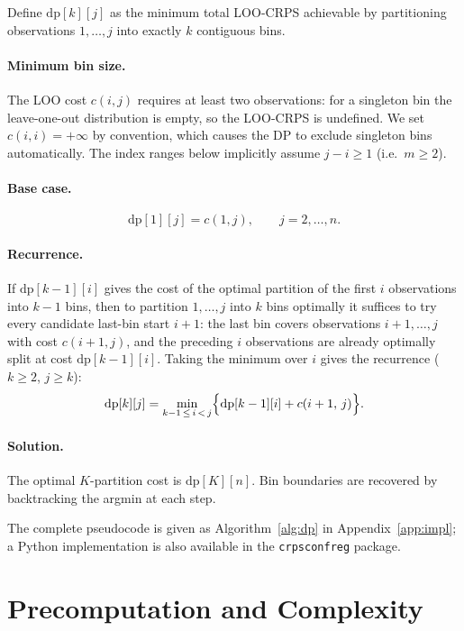 \documentclass[11pt]{article}
\begin{document}
Define $\mathrm{dp}[k][j]$ as the minimum total LOO-CRPS achievable by partitioning
observations $1, \ldots, j$ into exactly $k$ contiguous bins.

\paragraph{Minimum bin size.}
The LOO cost $c(i,j)$ requires at least two observations: for a singleton bin
the leave-one-out distribution is empty, so the LOO-CRPS is undefined.
We set $c(i,i) = +\infty$ by convention, which causes the DP to exclude
singleton bins automatically.
The index ranges below implicitly assume $j - i \ge 1$ (i.e.\ $m \ge 2$).

\paragraph{Base case.}
\[
  \mathrm{dp}[1][j] = c(1, j), \qquad j = 2, \ldots, n.
\]

\paragraph{Recurrence.}
If $\mathrm{dp}[k-1][i]$ gives the cost of the optimal partition of the first
$i$ observations into $k-1$ bins, then to partition $1,\ldots,j$ into $k$ bins
optimally it suffices to try every candidate last-bin start $i+1$:
the last bin covers observations $i+1,\ldots,j$ with cost $c(i+1,j)$, and the
preceding $i$ observations are already optimally split at cost $\mathrm{dp}[k-1][i]$.
Taking the minimum over $i$ gives the recurrence ($k \ge 2$, $j \ge k$):
\[
  \mathrm{dp}[k][j]
  = \min_{k-1 \,\le\, i \,<\, j}
    \Bigl\{\mathrm{dp}[k-1][i] + c(i+1,\, j)\Bigr\}.
\]

\paragraph{Solution.} The optimal $K$-partition cost is $\mathrm{dp}[K][n]$.
Bin boundaries are recovered by backtracking the argmin at each step.

The complete pseudocode is given as Algorithm~\ref{alg:dp} in Appendix~\ref{app:impl};
a Python implementation is also available in the \texttt{crpsconfreg} package.

\section{Precomputation and Complexity}
\label{sec:precomp}
\end{document}
